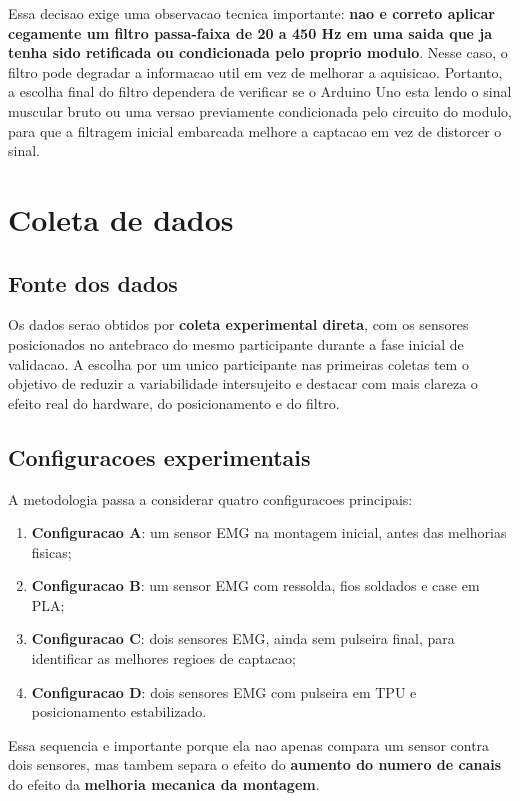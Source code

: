 \documentclass[12pt,oneside,a4paper,brazilian]{abntex2}
\begin{document}
Essa decisao exige uma observacao tecnica importante: \textbf{nao e correto aplicar cegamente um filtro passa-faixa de 20 a 450 Hz em uma saida que ja tenha sido retificada ou condicionada pelo proprio modulo}. Nesse caso, o filtro pode degradar a informacao util em vez de melhorar a aquisicao. Portanto, a escolha final do filtro dependera de verificar se o Arduino Uno esta lendo o sinal muscular bruto ou uma versao previamente condicionada pelo circuito do modulo, para que a filtragem inicial embarcada melhore a captacao em vez de distorcer o sinal.

\section{Coleta de dados}

\subsection{Fonte dos dados}

Os dados serao obtidos por \textbf{coleta experimental direta}, com os sensores posicionados no antebraco do mesmo participante durante a fase inicial de validacao. A escolha por um unico participante nas primeiras coletas tem o objetivo de reduzir a variabilidade intersujeito e destacar com mais clareza o efeito real do hardware, do posicionamento e do filtro.

\subsection{Configuracoes experimentais}

A metodologia passa a considerar quatro configuracoes principais:

\begin{enumerate}
  \item \textbf{Configuracao A}: um sensor EMG na montagem inicial, antes das melhorias fisicas;
  \item \textbf{Configuracao B}: um sensor EMG com ressolda, fios soldados e case em PLA;
  \item \textbf{Configuracao C}: dois sensores EMG, ainda sem pulseira final, para identificar as melhores regioes de captacao;
  \item \textbf{Configuracao D}: dois sensores EMG com pulseira em TPU e posicionamento estabilizado.
\end{enumerate}

Essa sequencia e importante porque ela nao apenas compara um sensor contra dois sensores, mas tambem separa o efeito do \textbf{aumento do numero de canais} do efeito da \textbf{melhoria mecanica da montagem}.
\end{document}
